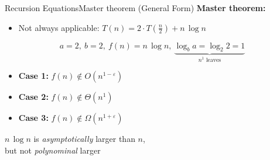 
\begin{frame}{Recursion Equations}{Master theorem (General Form)}
  \textbf{Master theorem:}
  \begin{itemize}
    \item<2->
      Not always applicable:
      {\color{MainA}$T(n) = 2 \cdot T(\frac{n}{2}) + n \, \log n$}
  \end{itemize}
  \vspace{1.0em}
  \begin{displaymath}
    a = 2, ~ b = 2, ~ f(n) = n \, \log n, ~
    \underbrace{\log_b a = \log_2 2 = 1}_{\text{$n^1$ leaves}}
  \end{displaymath}
  \begin{itemize}
    \item<4->
      \textbf{Case 1:}
      $f(n) \notin O(n^{1-\varepsilon})$
    \item<5->
      \textbf{Case 2:}
      $f(n) \notin \Theta(n^1)$
    \item<6->
      \textbf{Case 3:}
      $f(n) \notin \Omega(n^{1+\varepsilon})$
  \end{itemize}
  \begin{center}
    {\color{MainA}$n \, \log n$} is \textit{asymptotically} larger than
    {\color{MainA}$n$},\\ but not \textit{polynominal} larger
  \end{center}
\end{frame}


